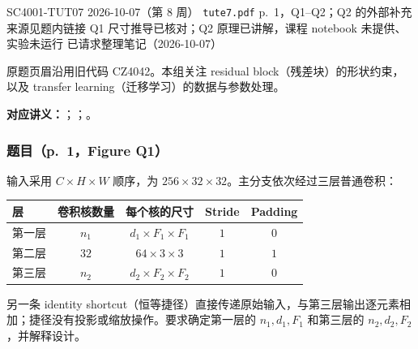 
\label{tutorial:SC4001-TUT07}
\tutorialmeta
  {SC4001-TUT07}
  {2026-10-07（第 8 周）}
  {\texttt{tute7.pdf} p.~1，Q1--Q2；Q2 的外部补充来源见题内链接}
  {Q1 尺寸推导已核对；Q2 原理已讲解，课程 notebook 未提供、实验未运行}
  {已请求整理笔记（2026-10-07）}

原题页眉沿用旧代码 CZ4042。本组关注 residual block（残差块）的形状约束，以及 transfer learning（迁移学习）的数据与参数处理。

\textbf{对应讲义：}；；。

\subsubsection*{题目（p.~1，Figure Q1）}
输入采用 $C\times H\times W$ 顺序，为 $256\times32\times32$。主分支依次经过三层普通卷积：
\begin{center}
\begin{tabular}{@{}lcccc@{}}
\toprule
层 & 卷积核数量 & 每个核的尺寸 & Stride & Padding \\
\midrule
第一层 & $n_1$ & $d_1\times F_1\times F_1$ & $1$ & $0$ \\
第二层 & $32$ & $64\times3\times3$ & $1$ & $1$ \\
第三层 & $n_2$ & $d_2\times F_2\times F_2$ & $1$ & $0$ \\
\bottomrule
\end{tabular}
\end{center}
另一条 identity shortcut（恒等捷径）直接传递原始输入，与第三层输出逐元素相加；捷径没有投影或缩放操作。要求确定第一层的 $n_1,d_1,F_1$ 和第三层的 $n_2,d_2,F_2$，并解释设计。

